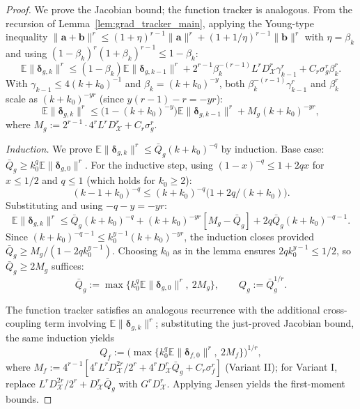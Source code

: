 \documentclass{article}
\newcommand{\cX}{\mathcal{X}}
\def\va{{\bm{a}}}
\def\vb{{\bm{b}}}
\newcommand{\E}{\mathbb{E}}
\begin{document}
\begin{proof}
We prove the Jacobian bound; the function tracker is analogous. From the recursion of Lemma~\ref{lem:grad_tracker_main}, applying the Young-type inequality $\|\va + \vb\|^r \le (1+\eta)^{r-1}\|\va\|^r + (1+1/\eta)^{r-1}\|\vb\|^r$ with $\eta = \beta_k$ and using $(1-\beta_k)^r(1+\beta_k)^{r-1} \le 1-\beta_k$:
\[
\E\|\bm\delta_{g,k}\|^r \le (1-\beta_k)\E\|\bm\delta_{g,k-1}\|^r + 2^{r-1}\beta_k^{-(r-1)} L^r D_\cX^r \gamma_{k-1}^r + C_r \sigma_g^r \beta_k^r.
\]
With $\gamma_{k-1} \le 4(k+k_0)^{-1}$ and $\beta_k = (k+k_0)^{-y}$, both $\beta_k^{-(r-1)}\gamma_{k-1}^r$ and $\beta_k^r$ scale as $(k+k_0)^{-yr}$ (since $y(r-1) - r = -yr$):
\begin{equation}\label{eq:convex_recur_clean}
\E\|\bm\delta_{g,k}\|^r \le \big(1 - (k+k_0)^{-y}\big)\E\|\bm\delta_{g,k-1}\|^r + M_g (k+k_0)^{-yr},
\end{equation}
where $M_g := 2^{r-1}\cdot 4^r L^r D_\cX^r + C_r \sigma_g^r$.

\emph{Induction.} We prove $\E\|\bm\delta_{g,k}\|^r \le \bar Q_g(k+k_0)^{-q}$ by induction. Base case: $\bar Q_g \ge k_0^q \E\|\bm\delta_{g,0}\|^r$. For the inductive step, using $(1-x)^{-q} \le 1 + 2qx$ for $x \le 1/2$ and $q \le 1$ (which holds for $k_0 \ge 2$):
\[
(k-1+k_0)^{-q} \le (k+k_0)^{-q}\big(1 + 2q/(k+k_0)\big).
\]
Substituting and using $-q-y = -yr$:
\[
\E\|\bm\delta_{g,k}\|^r \le \bar Q_g(k+k_0)^{-q} + (k+k_0)^{-yr}[M_g - \bar Q_g] + 2q\bar Q_g(k+k_0)^{-q-1}.
\]
Since $(k+k_0)^{-q-1} \le k_0^{y-1}(k+k_0)^{-yr}$, the induction closes provided $\bar Q_g \ge M_g/(1 - 2q k_0^{y-1})$. Choosing $k_0$ as in the lemma ensures $2qk_0^{y-1} \le 1/2$, so $\bar Q_g \ge 2 M_g$ suffices:
\begin{equation} \label{eq:Qg_explicit}
\bar Q_g := \max\{k_0^q \E\|\bm\delta_{g,0}\|^r,\ 2 M_g\}, \qquad Q_g := \bar Q_g^{1/r}.
\end{equation}

The function tracker satisfies an analogous recurrence with the additional cross-coupling term involving $\E\|\bm\delta_{g,k}\|^r$; substituting the just-proved Jacobian bound, the same induction yields
\begin{equation} \label{eq:Qf_explicit}
Q_f := \big(\max\{k_0^q \E\|\bm\delta_{f,0}\|^r,\ 2 M_f\}\big)^{1/r},
\end{equation}
where $M_f := 4^{r-1}[4^r L^r D_\cX^{2r}/2^r + 4^r D_\cX^r \bar Q_g + C_r \sigma_f^r]$ (Variant II); for Variant I, replace $L^r D_\cX^{2r}/2^r + D_\cX^r \bar Q_g$ with $G^r D_\cX^r$. Applying Jensen yields the first-moment bounds.
\end{proof}
\end{document}
